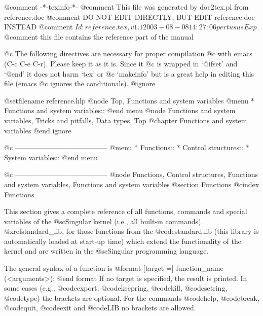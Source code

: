 @comment -*-texinfo-*-
@comment This file was generated by doc2tex.pl from reference.doc
@comment DO NOT EDIT DIRECTLY, BUT EDIT reference.doc INSTEAD
@comment $Id: reference.tex,v 1.1 2003-08-08 14:27:06 pertusus Exp $
@comment this file contains the reference part of the manual

@c The following directives are necessary for proper compilation
@c with emacs (C-c C-e C-r).  Please keep it as it is.  Since it
@c is wrapped in `@ifset' and `@end' it does not harm `tex' or
@c `makeinfo' but is a great help in editing this file (emacs
@c ignores the conditionals).
@ignore

@setfilename reference.hlp
@node Top, Functions and system variables
@menu
* Functions and system variables::
@end menu
@node Functions and system variables, Tricks and pitfalls, Data types, Top
@chapter Functions and system variables
@end ignore

@c ---------------------------------------
@menu
* Functions::
* Control structures::
* System variables::
@end menu

@c ---------------------------------------
@node Functions, Control structures, Functions and system variables, Functions and system variables
@section Functions
@cindex Functions

This section gives a complete reference of all functions, commands and
special variables of the @sc{Singular} kernel (i.e., all built-in
commands). @xref{standard_lib}, for those
functions from the @code{standard.lib} (this library is automatically
loaded at start-up time) which extend the functionality of the kernel
and are written
in the  @sc{Singular} programming language.

The general syntax of a function is
@format
                   [target =] function_name (<arguments>);
@end format
If no target is specified, the result is printed.
In some cases (e.g., @code{export}, @code{keepring}, @code{kill},
@code{setring}, @code{type}) the brackets are optional. For the commands
@code{help}, @code{break}, @code{quit}, @code{exit} and @code{LIB} no
brackets are allowed.

